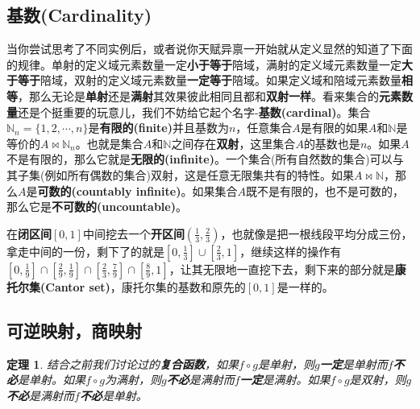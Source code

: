 \documentclass[mathserif,hyperref,UTF8,openany,b5paper]{ctexbook}
\newtheorem{thm}{定理}[section]
\begin{document}
\subsection{基数(Cardinality)}
当你尝试思考了不同实例后，或者说你天赋异禀一开始就从定义显然的知道了下面的规律。单射的定义域元素数量一定\textbf{小于等于}陪域，满射的定义域元素数量一定\textbf{大于等于}陪域，双射的定义域元素数量\textbf{一定等于}陪域。如果定义域和陪域元素数量\textbf{相等}，那么无论是\textbf{单射}还是\textbf{满射}其效果彼此相同且都和\textbf{双射一样}。看来集合的\textbf{元素数量}还是个挺重要的玩意儿，我们不妨给它起个名字-\textbf{基数(cardinal)}。集合$\mathbb{N}_n = \{1,2,\cdots,n\}$是\textbf{有限的(finite)}并且基数为$n$，任意集合$A$是有限的如果$A$和$\mathbb{N}$是等价的$A \bowtie \mathbb{N}_n$。也就是集合$A$和$\mathbb{N}$之间存在\textbf{双射}，这里集合$A$的基数也是$n$。如果$A$不是有限的，那么它就是\textbf{无限的(infinite)}。一个集合(所有自然数的集合)可以与其子集(例如所有偶数的集合)双射，这是任意无限集共有的特性。如果$A\bowtie \mathbb{N}$，那么$A$是\textbf{可数的(countably infinite)}。如果集合$A$既不是有限的，也不是可数的，那么它是\textbf{不可数的(uncountable)}。

在\textbf{闭区间}$[0,1]$中间挖去一个\textbf{开区间}$(\frac{1}{3},\frac{2}{3})$，也就像是把一根线段平均分成三份，拿走中间的一份，剩下了的就是$[0,\frac{1}{3}]\cup[\frac{2}{3},1]$，继续这样的操作有$[0,\frac{1}{9}]\cap[\frac{2}{9},\frac{1}{9}]\cap[\frac{2}{3},\frac{7}{9}]\cap[\frac{8}{9},1]$，让其无限地一直挖下去，剩下来的部分就是\textbf{康托尔集(Cantor set)}，康托尔集的基数和原先的$[0,1]$是一样的。
\subsection{可逆映射，商映射}
\begin{thm}
结合之前我们讨论过的\textbf{复合函数}，如果$f\circ g$是单射，则$g$\textbf{一定}是单射而$f$\textbf{不必}是单射。如果$f\circ g$为满射，则$g$\textbf{不必}是满射而$f$\textbf{一定}是满射。如果$f\circ g$是双射，则$g$\textbf{不必}是满射而$f$\textbf{不必}是单射。
\end{thm}
\end{document}
